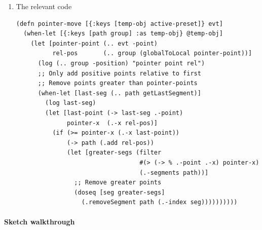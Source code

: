 \documentclass[a4paper,12pt]{article}
\begin{document}
\begin{enumerate}
\item The relevant code
\label{sec:org25240f3}
\begin{verbatim}
(defn pointer-move [{:keys [temp-obj active-preset]} evt]
  (when-let [{:keys [path group] :as temp-obj} @temp-obj]
    (let [pointer-point (.. evt -point)
          rel-pos       (.. group (globalToLocal pointer-point))]
      (log (.. group -position) "pointer point rel")
      ;; Only add positive points relative to first
      ;; Remove points greater than pointer-points
      (when-let [last-seg (.. path getLastSegment)]
        (log last-seg)
        (let [last-point (-> last-seg .-point)
              pointer-x  (.-x rel-pos)]
          (if (>= pointer-x (.-x last-point))
              (-> path (.add rel-pos))
              (let [greater-segs (filter
                                  #(> (-> % .-point .-x) pointer-x)
                                  (.-segments path))]
                ;; Remove greater points
                (doseq [seg greater-segs]
                  (.removeSegment path (.-index seg))))))))))
\end{verbatim}
\end{enumerate}

\paragraph{Sketch walkthrough}
\label{sec:orgaebcfc6}
\end{document}
